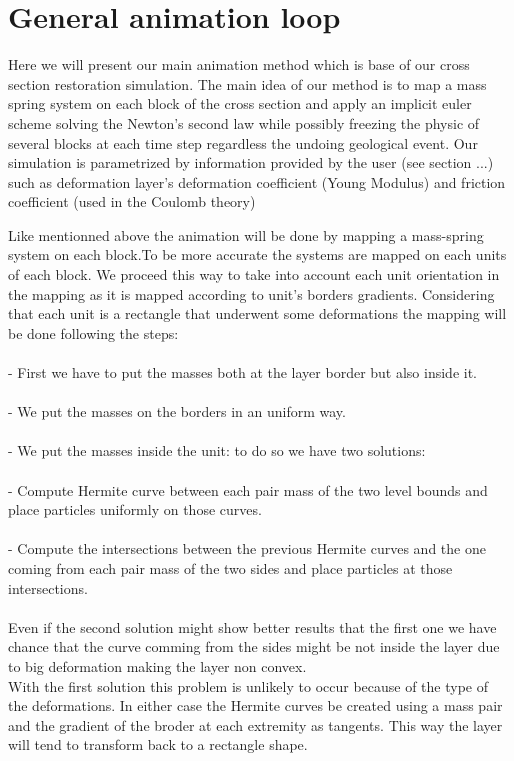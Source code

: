 \documentclass[12pt, a4paper]{report} %
\begin{document}
\section{General animation loop}
\label{sec:generalanimation}
Here we will present our main animation method which is base of our cross section restoration simulation. 
The main idea of our method is to map a mass spring system on each block of the cross section and apply an implicit euler scheme solving the Newton's second law while possibly freezing the physic of several blocks at each time step regardless the undoing geological event. 
Our simulation is parametrized by information provided by the user (see section ...) such as deformation layer's deformation coefficient (Young Modulus) and friction coefficient (used in the Coulomb theory)

Like mentionned above the animation will be done by mapping a mass-spring system on each block.To be more accurate the systems are mapped on each units of each block. We proceed this way to take into account each unit orientation in the mapping as it is mapped according to unit's borders gradients. Considering that each unit is a rectangle that underwent some deformations the mapping will be done following the steps:	\\\\		
\indent	- First we have to put the masses both at the layer border but also inside it.\\\\
\indent	- We put the masses on the borders in an uniform way.\\\\
\indent	- We put the masses inside the unit: to do so we have two solutions:\\\\
\indent \indent	- Compute Hermite curve between each pair mass of the two level bounds and place particles uniformly on those curves.\\\\
\indent \indent	- Compute the intersections between the previous Hermite curves and the one coming from each pair mass of the two sides and place particles at those intersections.\\\\
	Even if the second solution might show better results that the first one we have chance that the curve comming from the sides might be not inside the layer due to big deformation making the layer non convex. \\With the first solution this problem is unlikely to occur because of the type of the deformations. In either case the Hermite curves be created using a mass pair and the gradient of the broder at each extremity as tangents. This way the layer will tend to transform back to a rectangle shape.\\\\
\end{document}

